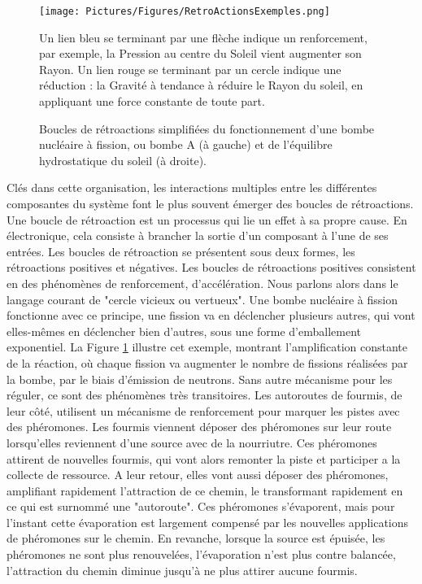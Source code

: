 			\begin{figure}
			\centering
			\texttt{[image: Pictures/Figures/RetroActionsExemples.png]}
			\caption{Boucles de rétroactions simplifiées du fonctionnement d'une bombe nucléaire à fission, ou bombe A (à gauche) et de l'équilibre hydrostatique du soleil (à droite).}{ Un lien bleu se terminant par une flèche indique un renforcement, par exemple, la Pression au centre du Soleil vient augmenter son Rayon. Un lien rouge se terminant par un cercle indique une réduction : la Gravité à tendance à réduire le Rayon du soleil, en appliquant une force constante de toute part.}
			\label{retroActions}
			\end{figure}
		
		Clés dans cette organisation, les interactions multiples entre les différentes composantes du système font le plus souvent émerger des boucles de rétroactions. Une boucle de rétroaction est un processus qui lie un effet à sa propre cause. En électronique, cela consiste à brancher la sortie d'un composant à l'une de ses entrées. Les boucles de rétroaction se présentent sous deux formes, les rétroactions positives et négatives. Les boucles de rétroactions positives consistent en des phénomènes de renforcement, d'accélération. Nous parlons alors dans le langage courant de "cercle vicieux ou vertueux". Une bombe nucléaire à fission fonctionne avec ce principe, une fission va en déclencher plusieurs autres, qui vont elles-mêmes en déclencher bien d'autres, sous une forme d'emballement exponentiel. La Figure \ref{retroActions} illustre cet exemple, montrant l'amplification constante de la réaction, où chaque fission va augmenter le nombre de fissions réalisées par la bombe, par le biais d'émission de neutrons. Sans autre mécanisme pour les réguler, ce sont des phénomènes très transitoires. Les autoroutes de fourmis, de leur côté, utilisent un mécanisme de renforcement pour marquer les pistes avec des phéromones. Les fourmis viennent déposer des phéromones sur leur route lorsqu'elles reviennent d'une source avec de la nourriutre. Ces phéromones attirent de nouvelles fourmis, qui vont alors remonter la piste et participer a la collecte de ressource. A leur retour, elles vont aussi déposer des phéromones, amplifiant rapidement l'attraction de ce chemin, le transformant rapidement en ce qui est surnommé une "autoroute". Ces phéromones s'évaporent, mais pour l'instant cette évaporation est largement compensé par les nouvelles applications de phéromones sur le chemin. En revanche, lorsque la source est épuisée, les phéromones ne sont plus renouvelées, l'évaporation n'est plus contre balancée, l'attraction du chemin diminue jusqu'à ne plus attirer aucune fourmis.
